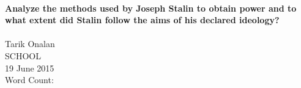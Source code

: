 \begin{titlepage}
    \vspace*{\fill}
    \begin{center}
        \HRule \\[0.4cm]
        { \large \bfseries Analyze the methods used by Joseph Stalin to obtain power and to what extent did Stalin follow the aims of his declared ideology? \\[0.4cm] }
        \HRule \\[1.5cm]

        Tarik Onalan
        \\[0.4cm]
        SCHOOL
        \\[0.4cm]
        19 June 2015
        \\[0.4cm]
        Word Count:
    \end{center}
    \vspace*{\fill}
\end{titlepage}